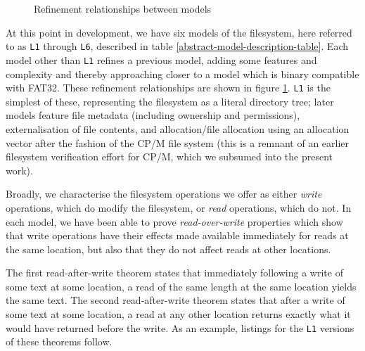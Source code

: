 \documentclass[submission,copyright,creativecommons]{eptcs}
\begin{document}
\begin{figure}
  \centering
  \caption{Refinement relationships between models}
  \label{refinement-figure}
\end{figure}

At this point in development, we have six models of the filesystem,
here referred to as \texttt{L1} through \texttt{L6}, described in
table \ref{abstract-model-description-table}. Each model other than
\texttt{L1}
refines a previous model, adding some features and complexity and
thereby approaching closer to a model which is binary compatible with
FAT32. These refinement relationships are shown in figure
\ref{refinement-figure}. \texttt{L1} is the simplest of these,
representing the filesystem as a literal directory tree; later models
feature file metadata (including ownership and permissions),
externalisation of file contents, and allocation/file allocation using
an allocation vector after the fashion of the CP/M file system (this
is a remnant of an earlier filesystem verification effort for CP/M,
which we subsumed into the present work).

Broadly, we characterise the filesystem
operations we offer as either \textit{write} operations, which do
modify the filesystem, or \textit{read} operations, which do not. In
each model, we have been able to prove \textit{read-over-write}
properties which show that write operations have
their effects made available immediately for reads at the same
location, but also that they do not affect reads at other locations.

The first read-after-write theorem states that immediately following a
write of some text at some location, a read of the same length at the
same location yields the same text. The second read-after-write
theorem states that after a write of some text at some location, a
read at any other location returns exactly what it would have returned
before the write. As an example, listings for the \texttt{L1} versions
of these theorems follow.
\end{document}
